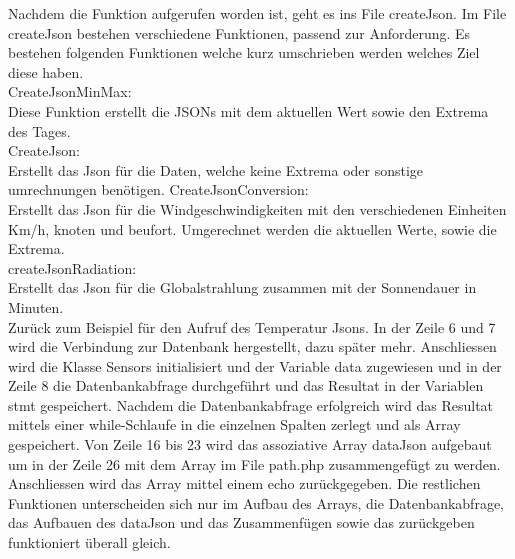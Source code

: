 Nachdem die Funktion aufgerufen worden ist, geht es ins File createJson. Im File createJson bestehen verschiedene Funktionen, passend zur Anforderung. Es bestehen folgenden Funktionen welche kurz umschrieben werden welches Ziel diese haben.\\ 

CreateJsonMinMax:\\
Diese Funktion erstellt die JSONs mit dem aktuellen Wert sowie den Extrema des Tages.\\
CreateJson:\\
Erstellt das Json für die Daten, welche keine Extrema oder sonstige umrechnungen benötigen. 
CreateJsonConversion:\\
Erstellt das Json für die Windgeschwindigkeiten mit den verschiedenen Einheiten Km/h, knoten und beufort. Umgerechnet werden die aktuellen Werte, sowie die Extrema.\\
createJsonRadiation:\\
Erstellt das Json für die Globalstrahlung zusammen mit der Sonnendauer in Minuten.\\

Zurück zum Beispiel für den Aufruf des Temperatur Jsons. In der Zeile 6 und 7 wird die Verbindung zur Datenbank hergestellt, dazu später mehr. Anschliessen wird die Klasse Sensors initialisiert und der Variable data zugewiesen und in der Zeile 8 die Datenbankabfrage durchgeführt und das Resultat in der Variablen stmt gespeichert. Nachdem die Datenbankabfrage erfolgreich wird das Resultat mittels einer while-Schlaufe in die einzelnen Spalten zerlegt und als Array gespeichert. Von Zeile 16 bis 23 wird das assoziative Array dataJson aufgebaut um in der Zeile 26 mit dem Array im File path.php zusammengefügt zu werden. Anschliessen wird das Array mittel einem echo zurückgegeben. Die restlichen Funktionen unterscheiden sich nur im Aufbau des Arrays, die Datenbankabfrage, das Aufbauen des dataJson und das Zusammenfügen sowie das zurückgeben funktioniert überall gleich. 


